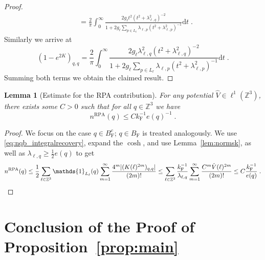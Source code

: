\documentclass[12pt,a4paper]{article}
\numberwithin{equation}{section}
\newcommand{\1}{\mathbb{I}}
\newcommand{\F}{\mathrm{F}}
\newcommand{\RPA}{\mathrm{RPA}}
\newcommand{\kF}{k_\F}
\newcommand{\Zstar}{\mathbb{Z}^3} %
\newcommand{\Z}{\mathbb{Z}}
\newcommand{\half}{\frac{1}{2}}
\theoremstyle{plain}
\newtheorem{lemma}[theorem]{Lemma}
\theoremstyle{definition}
\theoremstyle{remark}
\theoremstyle{plain}
\theoremstyle{definition}
\theoremstyle{remark}
\begin{document}
\begin{proof}
\begin{align}
	&= \frac{2}{\pi} \int_0^\infty \frac{2g_\ell t^2 (t^2+\lambda^2_{\ell,q})^{-2}}{1+ 2g_\ell\sum_{p \in L_\ell}\lambda_{\ell,p}(t^2+\lambda^2_{\ell,p})^{-1} } \mathrm{d}t \;. \label{eq:e-2k_integral}
\end{align}
Similarly we arrive at
\begin{equation} \label{eq:e2kfin}
	(1-e^{2K})_{q,q}
	= \frac{2}{\pi} \int_0^\infty \frac{2g_\ell \lambda_{\ell,q}^2 (t^2+\lambda^2_{\ell,q})^{-2}}{1+ 2g_\ell\sum_{p \in L_{\ell}}\lambda_{\ell,p}(t^2+\lambda^2_{\ell,p})^{-1} } \mathrm{d}t \;.
\end{equation}
Summing both terms we obtain the claimed result.
\end{proof}


\begin{lemma}[Estimate for the RPA contribution] \label{lem:nqb_bounds}
For any potential $ \hat{V} \in \ell^1(\Zstar) $, there exists some $ C > 0 $
such that for all $ q \in \Z^3 $ we have
\begin{equation} \label{eq:nqb_upperbound}
	n^{\RPA}(q)
	\le C \kF^{-1} e(q)^{-1} \;.
\end{equation}
\end{lemma}

\begin{proof}
We focus on the case $ q \in B_{\F}^c $; $ q \in B_{\F} $ is treated analogously. We use \eqref{eq:nqb_integralrecovery}, expand the $ \cosh $, and use Lemma~\ref{lem:normsk}, as well as $ \lambda_{\ell,q} \ge \frac{1}{2} e(q) $ to get
\[
	n^{\RPA}(q)
	\le \half \sum_{\ell \in \Zstar} \mathds{1}_{L_\ell}(q) \sum_{m=1}^{\infty} \frac{4^m |(K(\ell)^{2m})_{q,q}|}{(2m)!}
	\le \sum_{\ell \in \Zstar} \frac{\kF^{-1}}{\lambda_{\ell,q}} \sum_{m=1}^{\infty} \frac{C^m \hat{V}(\ell)^{2m}}{(2m)!}
	\le C \frac{\kF^{-1}}{e(q)} \;. \qedhere
\]
\end{proof}



\section{Conclusion of the Proof of Proposition~\ref{prop:main}}
\label{sec:mainthmproof}
\end{document}
